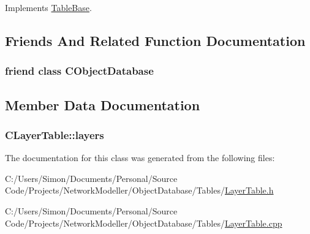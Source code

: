 Implements \hyperlink{class_table_base_a4a4e674632425ee19c24fae2881caefc}{Table\+Base}.



\subsection{Friends And Related Function Documentation}
\hypertarget{class_c_layer_table_a8451ee9e81bc51a04afb10dc6ee7e07e}{}
\subsubsection[{C\+Object\+Database}]{\setlength{\rightskip}{0pt plus 5cm}friend class {\bf C\+Object\+Database}\hspace{0.3cm}{\ttfamily [friend]}}\label{class_c_layer_table_a8451ee9e81bc51a04afb10dc6ee7e07e}


\subsection{Member Data Documentation}
\hypertarget{class_c_layer_table_aa8c5aada3ac311d579ba49b71a6f90f0}{}
\subsubsection[{layers}]{ C\+Layer\+Table\+::layers}\label{class_c_layer_table_aa8c5aada3ac311d579ba49b71a6f90f0}


The documentation for this class was generated from the following files\+:\begin{DoxyCompactItemize}
\item 
C\+:/\+Users/\+Simon/\+Documents/\+Personal/\+Source Code/\+Projects/\+Network\+Modeller/\+Object\+Database/\+Tables/\hyperlink{_layer_table_8h}{Layer\+Table.\+h}\item 
C\+:/\+Users/\+Simon/\+Documents/\+Personal/\+Source Code/\+Projects/\+Network\+Modeller/\+Object\+Database/\+Tables/\hyperlink{_layer_table_8cpp}{Layer\+Table.\+cpp}\end{DoxyCompactItemize}
